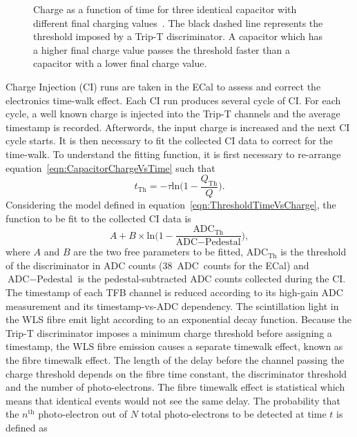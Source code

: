 {\begin{figure}[t!]
  \caption{Charge as a function of time for three identical capacitor with different final charging values~\cite{ND280CalibTN}.  The black dashed line represents the threshold imposed by a Trip-T discriminator.  A capacitor which has a higher final charge value passes the threshold faster than a capacitor with a lower final charge value.}
  \label{fig:CapacitorChargingTime}
\end{figure}
\newline
\newline
Charge Injection (CI) runs are taken in the ECal to assess and correct the electronics time-walk effect.  Each CI run produces several cycle of CI.  For each cycle, a well known charge is injected into the Trip-T channels and the average timestamp is recorded.  Afterwords, the input charge is increased and the next CI cycle starts.  It is then necessary to fit the collected CI data to correct for the time-walk.  To understand the fitting function, it is first necessary to re-arrange equation~\ref{eqn:CapacitorChargeVsTime} such that
\begin{equation}
t_{\textrm{Th}} = -\tau \textrm{ln}\big(1-\frac{Q_{\textrm{Th}}}{Q}\big).
\label{eqn:ThresholdTimeVsCharge}
\end{equation}
Considering the model defined in equation~\ref{eqn:ThresholdTimeVsCharge}, the function to be fit to the collected CI data is 
\begin{equation}
A + B\times\textrm{ln}\big(1 - \frac{\textrm{ADC}_{\textrm{Th}}}{\textrm{ADC} - \textrm{Pedestal}}\big),
\end{equation}
where $A$ and $B$ are the two free parameters to be fitted, $\textrm{ADC}_{\textrm{Th}}$ is the threshold of the discriminator in ADC counts (38~ADC~counts for the ECal) and $\textrm{ADC} - \textrm{Pedestal}$ is the pedestal-subtracted ADC counts collected during the CI.  The timestamp of each TFB channel is reduced according to its high-gain ADC measurement and its timestamp-vs-ADC dependency.
\newline
\newline
The scintillation light in the WLS fibre emit light according to an exponential decay function.  Because the Trip-T discriminator imposes a minimum charge threshold before assigning a timestamp, the WLS fibre emission causes a separate timewalk effect, known as the fibre timewalk effect.  The length of the delay before the channel passing the charge threshold depends on the fibre time constant, the discriminator threshold and the number of photo-electrons.  The fibre timewalk effect is statistical which means that identical events would not see the same delay.  The probability that the $n^{\textrm{th}}$ photo-electron out of $N$ total photo-electrons to be detected at time $t$ is defined as 
}
